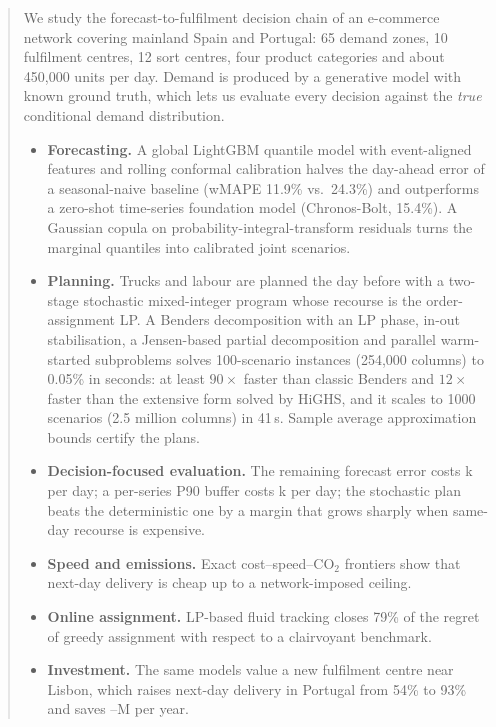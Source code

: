 \begin{abstract}
\noindent
We study the forecast-to-fulfilment decision chain of an e-commerce network covering mainland Spain and Portugal: 65 demand zones, 10 fulfilment centres, 12 sort centres, four product categories and about 450,000 units per day.
Demand is produced by a generative model with known ground truth, which lets us evaluate every decision against the \emph{true} conditional demand distribution.
\begin{itemize}[leftmargin=1.2em]
  \item \textbf{Forecasting.} A global LightGBM quantile model with event-aligned features and rolling conformal calibration halves the day-ahead error of a seasonal-naive baseline (wMAPE 11.9\% vs.\ 24.3\%) and outperforms a zero-shot time-series foundation model (Chronos-Bolt, 15.4\%). A Gaussian copula on probability-integral-transform residuals turns the marginal quantiles into calibrated joint scenarios.
  \item \textbf{Planning.} Trucks and labour are planned the day before with a two-stage stochastic mixed-integer program whose recourse is the order-assignment LP. A Benders decomposition with an LP phase, in-out stabilisation, a Jensen-based partial decomposition and parallel warm-started subproblems solves 100-scenario instances (254,000 columns) to 0.05\% in seconds: at least $90\times$ faster than classic Benders and $12\times$ faster than the extensive form solved by HiGHS, and it scales to 1000 scenarios (2.5 million columns) in 41\,s. Sample average approximation bounds certify the plans.
  \item \textbf{Decision-focused evaluation.} The remaining forecast error costs k per day; a per-series P90 buffer costs k per day; the stochastic plan beats the deterministic one by a margin that grows sharply when same-day recourse is expensive.
  \item \textbf{Speed and emissions.} Exact cost--speed--CO$_2$ frontiers show that next-day delivery is cheap up to a network-imposed ceiling.
  \item \textbf{Online assignment.} LP-based fluid tracking closes 79\% of the regret of greedy assignment with respect to a clairvoyant benchmark.
  \item \textbf{Investment.} The same models value a new fulfilment centre near Lisbon, which raises next-day delivery in Portugal from 54\% to 93\% and saves --M per year.
\end{itemize}
\end{abstract}
